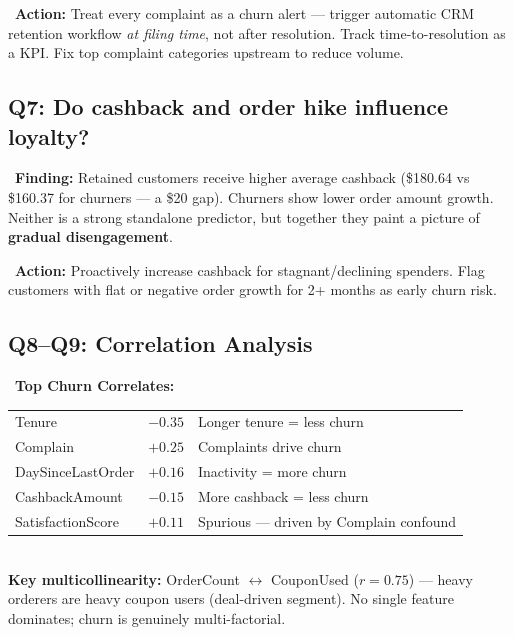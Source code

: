 \documentclass[11pt,a4paper]{article}
\begin{document}
\begin{actionbox}
\faArrowRight\ \textbf{Action:} Treat every complaint as a churn alert --- trigger automatic CRM retention workflow \emph{at filing time}, not after resolution. Track time-to-resolution as a KPI. Fix top complaint categories upstream to reduce volume.
\end{actionbox}

\subsection{Q7: Do cashback and order hike influence loyalty?}

\begin{findingbox}
\faSearch\ \textbf{Finding:} Retained customers receive higher average cashback (\$180.64 vs \$160.37 for churners --- a \$20 gap). Churners show lower order amount growth. Neither is a strong standalone predictor, but together they paint a picture of \textbf{gradual disengagement}.
\end{findingbox}

\begin{actionbox}
\faArrowRight\ \textbf{Action:} Proactively increase cashback for stagnant/declining spenders. Flag customers with flat or negative order growth for 2+ months as early churn risk.
\end{actionbox}

\subsection{Q8--Q9: Correlation Analysis}

\begin{infobox}
\faChartBar\ \textbf{Top Churn Correlates:}\\
\begin{tabular}{lcl}
Tenure & $-0.35$ & Longer tenure = less churn \\
Complain & $+0.25$ & Complaints drive churn \\
DaySinceLastOrder & $+0.16$ & Inactivity = more churn \\
CashbackAmount & $-0.15$ & More cashback = less churn \\
SatisfactionScore & $+0.11$ & Spurious --- driven by Complain confound \\
\end{tabular}\\[0.3cm]
\textbf{Key multicollinearity:} OrderCount $\leftrightarrow$ CouponUsed ($r = 0.75$) --- heavy orderers are heavy coupon users (deal-driven segment). No single feature dominates; churn is genuinely multi-factorial.
\end{infobox}
\end{document}
